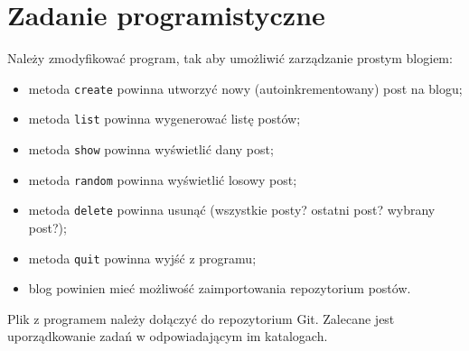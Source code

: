 \documentclass{article}
\begin{document}
	\section{Zadanie programistyczne}
	Należy zmodyfikować program, tak aby umożliwić zarządzanie prostym blogiem:
	
	\begin{itemize}
		\item metoda \texttt{create} powinna utworzyć nowy (autoinkrementowany) post na blogu;
		\item metoda \texttt{list} powinna wygenerować listę postów;
		\item metoda \texttt{show} powinna wyświetlić dany post;
		\item metoda \texttt{random} powinna wyświetlić losowy post;
		\item metoda \texttt{delete} powinna usunąć (wszystkie posty? ostatni post? wybrany post?);
		\item metoda \texttt{quit} powinna wyjść z programu;
		\item blog powinien mieć możliwość zaimportowania repozytorium postów.
	\end{itemize}
	
	Plik z programem należy dołączyć do repozytorium Git. Zalecane jest uporządkowanie zadań w odpowiadającym im katalogach.
\end{document}
